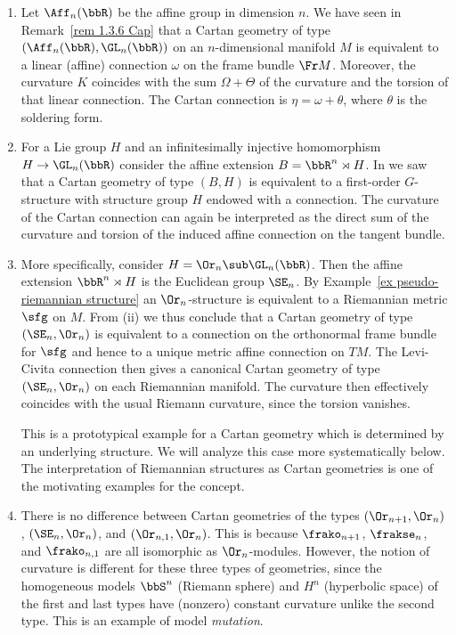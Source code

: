 \begin{example}\label{ex 1.5.1 Cap}
    \begin{enumerate}[label=(\roman*)]
        \item Let $\Aff_n(\bbR)$ be the affine group in dimension $n$. We have seen in Remark~\ref{rem 1.3.6 Cap} that a Cartan geometry of type $(\Aff_n(\bbR),\GL_n(\bbR))$ on an $n$-dimensional manifold $M$ is equivalent to a linear (affine) connection $\omega$ on the frame bundle $\Fr M$. Moreover, the curvature $K$ coincides with the sum $\Omega+\Theta$ of the curvature and the torsion of that linear connection. The Cartan connection is $\eta=\omega+\theta$, where $\theta$ is the soldering form.
        \item For a Lie group $H$ and an infinitesimally injective homomorphism $H\to \GL_n(\bbR)$ consider the affine extension $B=\bbR^n\rtimes H$. In  we saw that a Cartan geometry of type $(B,H)$ is equivalent to a first-order $G$-structure with structure group $H$ endowed with a connection. The curvature of the Cartan connection can again be interpreted as the direct sum of the curvature and torsion of the induced affine connection on the tangent bundle.
        \item More specifically, consider $H=\Or_n\sub \GL_n(\bbR)$. Then the affine extension $\bbR^n\rtimes H$ is the Euclidean group $\SE_n$. By Example~\ref{ex pseudo-riemannian structure} an $\Or_n$-structure is equivalent to a Riemannian metric $\sfg$ on $M$. From (ii) we thus conclude that a Cartan geometry of type $(\SE_n,\Or_n)$ is equivalent to a connection on the orthonormal frame bundle for $\sfg$ and hence to a unique metric affine connection on $TM$. The Levi-Civita connection then gives a canonical Cartan geometry of type $(\SE_n,\Or_n)$ on each Riemannian manifold. The curvature then effectively coincides with the usual Riemann curvature, since the torsion vanishes.
        
        This is a prototypical example for a Cartan geometry which is determined by an underlying structure. We will analyze this case more systematically below. The interpretation of Riemannian structures as Cartan geometries is one of the motivating examples for the concept. 
        \item There is no difference between Cartan geometries of the types $(\Or_{n+1},\Or_n)$, $(\SE_n,\Or_n)$, and $(\Or_{n,1},\Or_n)$. This is because $\frako_{n+1}$, $\frakse_{n}$, and $\frako_{n,1}$ are all isomorphic as $\Or_n$-modules. However, the notion of curvature is different for these three types of geometries, since the homogeneous models $\bbS^n$ (Riemann sphere) and $H^n$ (hyperbolic space) of the first and last types have (nonzero) constant curvature unlike the second type. This is an example of model \emph{mutation}.
    \end{enumerate}
\end{example}

